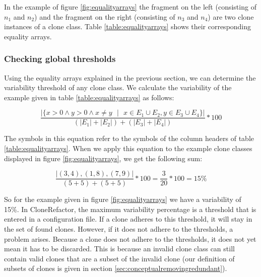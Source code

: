 In the example of figure \ref{fig:equalityarrays} the fragment on the left (consisting of $n_1$ and $n_2$) and the fragment on the right (consisting of $n_3$ and $n_4$) are two clone instances of a clone class. Table \ref{table:equalityarrays} shows their corresponding equality arrays.

\subsubsection{Checking global thresholds}
Using the equality arrays explained in the previous section, we can determine the variability threshold of any clone class. We calculate the variability of the example given in table \ref{table:equalityarrays} as follows:

\begin{equation}\label{eq:variabilityclonerefactor}
\frac{|\{x>0 \land y>0 \land x \neq y\text{ }|\text{ }x \in E_1 \cup E_2, y \in E_3 \cup E_4\}|}{(|E_1|+|E_2|)+(|E_3|+|E_4|)}*100
\end{equation}

The symbols in this equation refer to the symbols of the column headers of table \ref{table:equalityarrays}. When we apply this equation to the example clone classes displayed in figure \ref{fig:equalityarrays}, we get the following sum:

\begin{equation}\label{eq:sumequality}
\frac{|{(3,4), (1,8), (7,9)}|}{(5+5)+(5+5)}*100 = \frac{3}{20}*100 = 15\%
\end{equation}

So for the example given in figure \ref{fig:equalityarrays} we have a variability of 15\%. In CloneRefactor, the maximum variability percentage is a threshold that is entered in a configuration file. If a clone adheres to this threshold, it will stay in the set of found clones. However, if it does not adhere to the thresholds, a problem arises. Because a clone does not adhere to the thresholds, it does not yet mean it has to be discarded. This is because an invalid clone class can still contain valid clones that are a subset of the invalid clone (our definition of subsets of clones is given in section \ref{sec:conceptualremovingredundant}).


